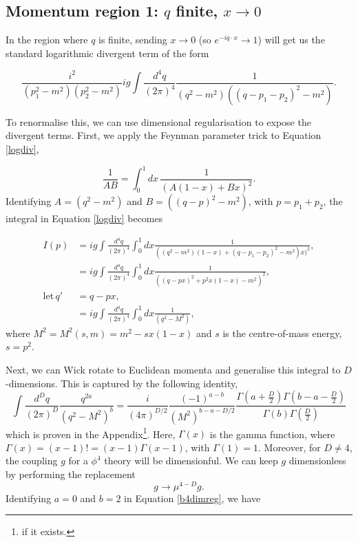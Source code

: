 \documentclass{article}
\begin{document}
\subsection{Momentum region 1: $q$ finite, $x\rightarrow 0$}

In the region where $q$ is finite, sending $x\rightarrow 0$ (so $e^{-iq\cdot x} \rightarrow 1$) will get  us the standard logarithmic divergent term of the form 

\begin{equation}
    \frac{i^2}{(p_1^2-m^2)(p_2^2-m^2)}ig\int \frac{d^4q}{(2\pi)^4} \frac{1}{(q^2-m^2)((q-p_1-p_2)^2 - m^2)}.
    \label{logdiv}
\end{equation}

To renormalise this, we can use dimensional regularisation to expose the divergent terms. First, we apply the Feynman parameter trick to Equation \ref{logdiv},

\begin{equation}
    \frac{1}{AB} = \int_0^1 dx \, \frac{1}{(A(1-x) + Bx)^2}.
\label{Feynparam trick}
\end{equation}
Identifying $A=(q^2-m^2)$ and $B=((q-p)^2-m^2)$, with $p=p_1+p_2$, the integral in Equation \ref{logdiv} becomes

\begin{equation}
\begin{split}
    I(p) &= ig\int \frac{d^4q}{(2\pi)^4}\int^1_0 dx \frac{1}{((q^2-m^2)(1-x) +(q-p_1-p_2)^2 - m^2)x)^2},\\
    &= ig\int \frac{d^4q}{(2\pi)^4}\int^1_0 dx \frac{1}{((q-px)^2 + p^2x(1-x) - m^2 )^2},\\
    \mathrm{let}\, q'&= q-px,\\
    &= ig\int \frac{d^4q}{(2\pi)^4}\int^1_0 dx \frac{1}{(q^2 -M^2)},
    \label{b4dimreg}
\end{split}
\end{equation}
where $M^2=M^2(s,m)=m^2-sx(1-x)$ and $s$ is the centre-of-mass energy, $s=p^2$.

Next, we can Wick rotate to Euclidean momenta and generalise this integral to $D$-dimensions. This is captured by the following identity, 
\begin{equation}
    \int\frac{d^Dq}{(2\pi)^D} \frac{q^{2a}}{(q^2-M^2)^b}=\frac{i}{(4\pi)^{D/2}}\frac{(-1)^{a-b}}{(M^2)^{b-a-D/2}} \frac{\Gamma(a+\frac{D}{2})\Gamma(b-a-\frac{D}{2})}{\Gamma(b)\Gamma(\frac{D}{2})}
\end{equation}
which is proven in the Appendix\footnote{if it exists.}. Here, $\Gamma(x)$ is the gamma function, where $\Gamma(x) = (x-1)! = (x-1)\Gamma(x-1)$, with $\Gamma(1)=1$. Moreover, for $D\neq 4$, the coupling $g$ for a $\phi^4$ theory will be dimensionful. We can keep $g$ dimensionless by performing the replacement
\begin{equation}
    g \rightarrow \mu^{4-D}g.
\end{equation}
Identifying $a=0$ and $b=2$ in Equation \ref{b4dimreg}, we have 
\end{document}
